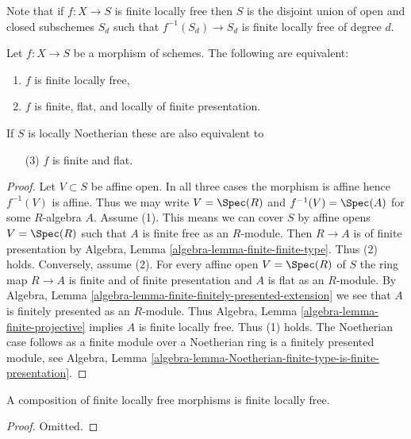 \noindent
Note that if $f : X \to S$ is finite locally free then $S$ is the disjoint
union of open and closed subschemes $S_d$ such that $f^{-1}(S_d) \to S_d$
is finite locally free of degree $d$.

\begin{lemma}
\label{lemma-finite-flat}
Let $f : X \to S$ be a morphism of schemes.
The following are equivalent:
\begin{enumerate}
\item $f$ is finite locally free,
\item $f$ is finite, flat, and locally of finite presentation.
\end{enumerate}
If $S$ is locally Noetherian these are also equivalent to
\begin{enumerate}
\item[(3)] $f$ is finite and flat.
\end{enumerate}
\end{lemma}

\begin{proof}
Let $V \subset S$ be affine open. In all three cases
the morphism is affine hence $f^{-1}(V)$ is affine.
Thus we may write $V = \Spec(R)$ and $f^{-1}(V) = \Spec(A)$
for some $R$-algebra $A$.
Assume (1). This means we can cover $S$ by affine opens
$V = \Spec(R)$ such that $A$ is finite free as an $R$-module.
Then $R \to A$ is of finite presentation by
Algebra, Lemma \ref{algebra-lemma-finite-finite-type}.
Thus (2) holds. Conversely, assume (2).
For every affine open $V = \Spec(R)$ of $S$ the ring map
$R \to A$ is finite and of finite presentation and $A$ is flat
as an $R$-module. By
Algebra, Lemma \ref{algebra-lemma-finite-finitely-presented-extension}
we see that $A$ is finitely presented as an $R$-module.
Thus Algebra, Lemma \ref{algebra-lemma-finite-projective}
implies $A$ is finite locally free. Thus (1) holds.
The Noetherian case follows as a finite module over a Noetherian ring
is a finitely presented module, see Algebra,
Lemma \ref{algebra-lemma-Noetherian-finite-type-is-finite-presentation}.
\end{proof}

\begin{lemma}
\label{lemma-composition-finite-locally-free}
A composition of finite locally free morphisms is finite locally free.
\end{lemma}

\begin{proof}
Omitted.
\end{proof}

